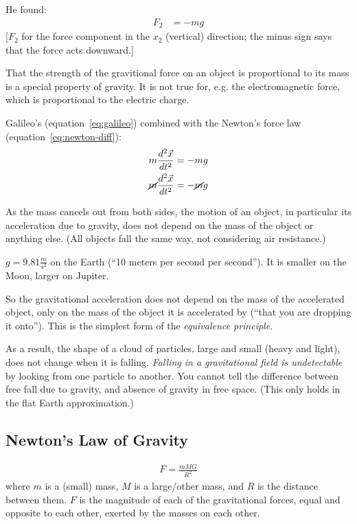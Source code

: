 \documentclass[pagesize,headsepline,10pt,parskip=half,BCOR=12mm]{scrreprt}
\newcommand{\eg}{\mbox{e.g.}\xspace}
\begin{document}
        He found:
        \begin{align}\label{eq:galileo}
          F_2 &= -mg
        \end{align}
        [$F_2$ for the force component in the $x_2$ (vertical)
        direction; the minus sign says that the force acts downward.]

        That the strength of the gravitional force on an object is
        proportional to its mass is a special property of gravity.
        It is not true for, \eg the electromagnetic force, which is
        proportional to the electric charge.

        Galileo's (equation~\ref{eq:galileo}) combined with the
        Newton's force law (equation~\ref{eq:newton-diff}):
        \begin{align}
          m\frac{d^2\vec x}{dt^2} &= -mg \\
          \cancel{m}\frac{d^2\vec x}{dt^2} &= -\cancel{m}g
        \end{align}

        As the mass cancels out from both sides, the motion of an
        object, in particular its acceleration due to gravity, does
        not depend on the mass of the object or anything else. (All
        objects fall the same way, not considering air resistance.)

        $g = 9.81 \frac{m}{s^2}$ on the Earth (``10 meters per second
        per second''). It is smaller on the Moon, larger on Jupiter.

        So the gravitational acceleration does not depend on the mass
        of the accelerated object, only on the mass of the object it
        is accelerated by (``that you are dropping it onto''). This
        is the simplest form of the \emph{equivalence principle}.

        As a result, the shape of a cloud of particles, large and
        small (heavy and light), does not change when it is falling.
        \emph{Falling in a gravitational field is undetectable} by
        looking from one particle to another.  You cannot tell the
        difference between free fall due to gravity, and absence of
        gravity in free space. (This only holds in the flat Earth
        approximation.)

      \subsection{Newton's Law of Gravity}
        \begin{align}\label{eq:newton-gravity}
          F = \frac{mMG}{R^2}
        \end{align}
        where $m$ is a (small) mass, $M$ is a large/other mass, and
        $R$ is the distance between them.  $F$ is the magnitude of
        each of the gravitational forces, equal and opposite to
        each other, exerted by the masses on each other.
\end{document}
